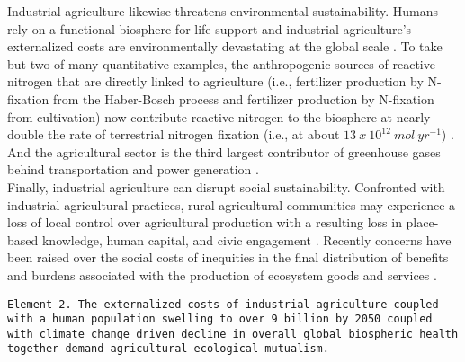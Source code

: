 Industrial agriculture likewise threatens environmental sustainability. Humans rely on a functional biosphere for life support and industrial agriculture's externalized costs are environmentally devastating at the global scale \citep{tilman_agricultural_2002, wolfe_crop_2000, ceballos_accelerated_2015}. To take but two of many quantitative examples, the anthropogenic sources of reactive nitrogen that are directly linked to agriculture (i.e., fertilizer production by N-fixation from the Haber-Bosch process and fertilizer production by N-fixation from cultivation) now contribute reactive nitrogen to the biosphere at nearly double the rate of terrestrial nitrogen fixation (i.e., at about $13 \ x \ 10^{12} \ mol \ yr^{-1}$) \citep{canfield_evolution_2010}. And the agricultural sector is the third largest contributor of greenhouse gases behind transportation and power generation \citep{gliessman_agroecology:_2015}. \\

Finally, industrial agriculture can disrupt social sustainability. Confronted with industrial agricultural practices, rural agricultural communities may experience a loss of local control over agricultural production with a resulting loss in place-based knowledge, human capital, and civic engagement \citep{beus_conventional_1990, oecd_well-being_2001}. Recently concerns have been raised over the social costs of inequities in the final distribution of benefits and burdens associated with the production of ecosystem goods and services \citep{berbes-blazquez_towards_2016}.\\

\begin{sloppypar}
\texttt{Element 2. The externalized costs of industrial agriculture coupled with a human population swelling to over 9 billion by 2050 coupled with climate change driven decline in overall global biospheric health together demand agricultural-ecological mutualism.} \\
\end{sloppypar}

